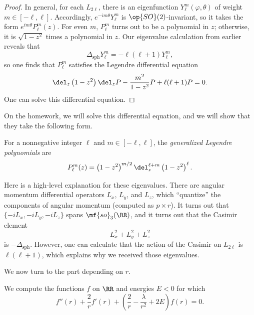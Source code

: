 \documentclass[../notes.tex]{subfiles}
\begin{document}
\begin{proof}
	In general, for each $L_{2\ell}$, there is an eigenfunction $Y_\ell^m(\varphi,\theta)$ of weight $m\in[-\ell,\ell]$. Accordingly, $e^{-im\theta}Y_\ell^m$ is $\op{SO}(2)$-invariant,\todo{} so it takes the form $e^{im\theta}P_\ell^m(z)$. For even $m$, $P_\ell^m$ turns out to be a polynomial in $z$; otherwise, it is $\sqrt{1-z^2}$ times a polynomial in $z$. Our eigenvalue calculation from earlier reveals that
	\[\Delta_{\mathrm{sph}}Y_\ell^m=-\ell(\ell+1)Y_\ell^m,\]
	so one finds that $P_\ell^m$ satisfies the Legendre differential equation
	\[\del_z\left(1-z^2\right)\del_zP-\frac{m^2}{1-z^2}P+\ell(\ell+1)P=0.\]
	One can solve this differential equation.
\end{proof}
On the homework, we will solve this differential equation, and we will show that they take the following form.
\begin{definition}
	For a nonnegative integer $\ell$ and $m\in[-\ell,\ell]$, the \textit{generalized Legendre polynomials} are
	\[P_\ell^m(z)=\left(1-z^2\right)^{m/2}\del_z^{\ell+m}\left(1-z^2\right)^\ell.\]
\end{definition}
\begin{remark}
	Here is a high-level explanation for these eigenvalues. There are angular momentum differential operators $L_x$, $L_y$, and $L_z$, which ``quantize'' the components of angular momentum (computed as $p\times r$). It turns out that $\{-iL_x,-iL_y,-iL_z\}$ spans $\mf{so}_3(\RR)$, and it turns out that the Casimir element
	\[L_x^2+L_y^2+L_z^2\]
	is $-\Delta_{\mathrm{sph}}$. However, one can calculate that the action of the Casimir on $L_{2\ell}$ is $\ell(\ell+1)$, which explains why we received those eigenvalues.
\end{remark}
We now turn to the part depending on $r$.
\begin{lemma}
	We compute the functions $f$ on $\RR$ and energies $E<0$ for which
	\[f''(r)+\frac2rf'(r)+\left(\frac2r-\frac\lambda{r^2}+2E\right)f(r)=0.\]
\end{lemma}
\end{document}
